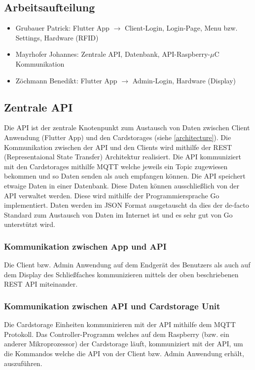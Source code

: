 \documentclass[a4paper]{article}
\begin{document}
\pagebreak

\subsection{Arbeitsaufteilung}
\begin{itemize}
  \item Grubauer Patrick: Flutter App $\rightarrow$ Client-Login, Login-Page, Menu bzw. Settings, Hardware (RFID)
  \item Mayrhofer Johannes: Zentrale API, Datenbank, API-Raspberry-$\mu$C Kommunikation
  \item Zöchmann Benedikt: Flutter App $\rightarrow$ Admin-Login, Hardware (Display)
\end{itemize}

\newpage

\subsection{Zentrale API}
Die API ist der zentrale Knotenpunkt zum Austausch von Daten zwischen Client Anwendung (Flutter App) und den Cardstorages (siehe \autoref{architecture}). Die Kommunikation zwischen der API und den Clients wird mithilfe der REST (Representaional State Transfer) Architektur realisiert. Die API kommuniziert mit den Cardstorages mithilfe MQTT welche jeweils ein Topic zugewiesen bekommen und so Daten senden als auch empfangen können. Die API speichert etwaige Daten in einer Datenbank. Diese Daten können ausschließlich von der API verwaltet werden. Diese wird mithilfe der Programmiersprache Go implementiert. Daten werden im JSON Format ausgetauscht da dies der de-facto Standard zum Austausch von Daten im Internet ist und es sehr gut von Go unterstützt wird.   

\subsubsection{Kommunikation zwischen App und API}
Die Client bzw. Admin Anwendung auf dem Endgerät des Benutzers als auch auf dem Display des Schließfaches kommunizieren mittels der oben beschriebenen REST API miteinander. 

\subsubsection{Kommunikation zwischen API und Cardstorage Unit}
Die Cardstorage Einheiten kommunizieren mit der API mithilfe dem MQTT Protokoll. Das Controller-Programm welches auf dem Raspberry (bzw. ein anderer Mikroprozessor) der Cardstorage läuft, kommuniziert mit der API, um die Kommandos welche die API von der Client bzw. Admin Anwendung erhält, auszuführen.
\end{document}
